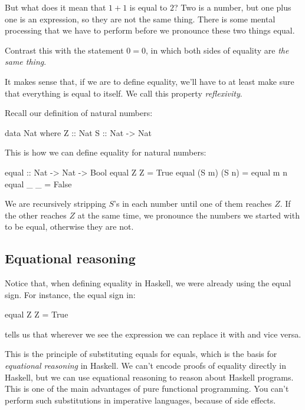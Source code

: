 \documentclass[DaoFP]{subfiles}
\begin{document}
But what does it mean that $1+1$ is equal to $2$? Two is a number, but one plus one is an expression, so they are not the same thing. There is some mental processing that we have to perform before we pronounce these two things equal. 

Contrast this with the statement $0 = 0$, in which both sides of equality are \emph{the same thing}. 

It makes sense that, if we are to define equality, we'll have to at least make sure that everything is equal to itself. We call this property \emph{reflexivity}. 

Recall our definition of natural numbers:
\begin{haskell}
data Nat where
  Z :: Nat
  S :: Nat -> Nat
\end{haskell}
This is how we can define equality for natural numbers:
\begin{haskell}
equal :: Nat -> Nat -> Bool
equal Z Z = True
equal (S m) (S n) = equal m n
equal _ _ = False
\end{haskell}
We are recursively stripping $S$'s in each number until one of them reaches $Z$. If the other reaches $Z$ at the same time, we pronounce the numbers we started with to be equal, otherwise they are not. 

\subsection{Equational reasoning}

Notice that, when defining equality in Haskell, we were already using the equal sign. For instance, the equal sign in:
\begin{haskell}
equal Z Z = True
\end{haskell}
tells us that wherever we see the expression  we can replace it with  and vice versa. 

This is the principle of substituting equals for equals, which is the basis for \emph{equational reasoning} in Haskell. We can't encode proofs of equality directly in Haskell, but we can use equational reasoning to reason about Haskell programs. This is one of the main advantages of pure functional programming. You can't perform such substitutions in imperative languages, because of side effects.
\end{document}
